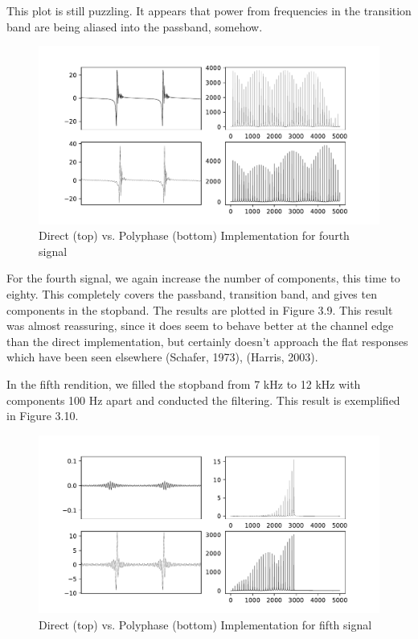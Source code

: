\documentclass{report}
\begin{document}
This plot is still puzzling.  It appears that power from frequencies in the transition band are being aliased into the passband, somehow.

\begin{figure}[!ht]
\includegraphics[scale=.55]{Figure_9.pdf}
\caption{Direct (top) vs. Polyphase (bottom) Implementation for fourth signal}
\end{figure} 

For the fourth signal, we again increase the number of components, this time to eighty.  This completely covers the passband, transition band, and gives ten components in the stopband. The results are plotted in Figure 3.9.  This result was almost reassuring, since it does seem to behave better at the channel edge than the direct implementation, but certainly doesn't approach the flat responses which have been seen elsewhere (Schafer, 1973), (Harris, 2003).  

In the fifth rendition, we filled the stopband from 7 kHz to 12 kHz with components 100 Hz apart and conducted the filtering.  This result is exemplified in Figure 3.10.

\begin{figure}[!ht]
\includegraphics[scale=.55]{Figure_10.pdf}
\caption{Direct (top) vs. Polyphase (bottom) Implementation for fifth signal}
\end{figure} 
 
\end{document}

